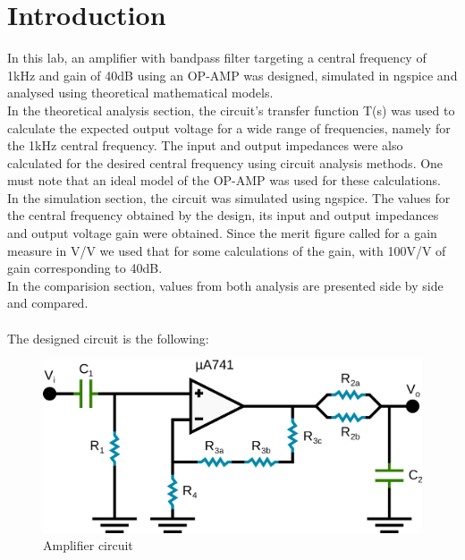 \section{Introduction}
\label{sec:intro}
In this lab, an amplifier with bandpass filter targeting a central frequency of 1kHz and gain of 40dB using an OP-AMP was designed, simulated in ngspice and analysed using theoretical mathematical models.\\
 In the theoretical analysis section, the circuit's transfer function T(s) was used to calculate the expected output voltage for a wide range of frequencies, namely for the 1kHz central frequency. The input and output impedances were also calculated for the desired central frequency using circuit analysis methods. One must note that an ideal model of the OP-AMP was used for these calculations. \\
 In the simulation section, the circuit was simulated using ngspice. The values for the central frequency obtained by the design, its input and output impedances and output voltage gain were obtained. Since the merit figure called for a gain measure in V/V we used that for some calculations of the gain, with 100V/V of gain corresponding to 40dB.\\
In the comparision section, values from both analysis are presented side by side and compared.\\ \\
The designed circuit is the following:

\begin{figure} [!htb] 
  \includegraphics[width=\linewidth]{circuit.png}
  \vspace{1cm}
  \caption{Amplifier circuit}
  \label{fig:circuit}
  \hfill
\end{figure}



\FloatBarrier
